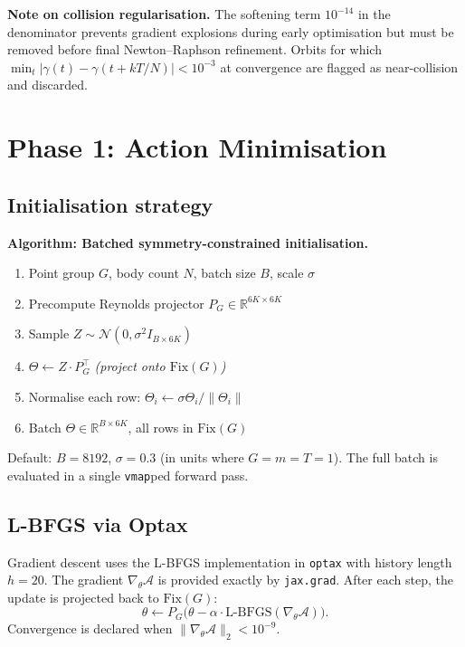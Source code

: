 \documentclass[12pt, a4paper]{article}
\theoremstyle{definition}
\newcommand{\R}{\mathbb{R}}
\newcommand{\Action}{\mathcal{A}}
\newcommand{\Fix}{\mathrm{Fix}}
\begin{document}
\textbf{Note on collision regularisation.} The softening term $10^{-14}$ in
the denominator prevents gradient explosions during early optimisation but
must be removed before final Newton--Raphson refinement.  Orbits for which
$\min_t |\gamma(t) - \gamma(t+kT/N)| < 10^{-3}$ at convergence are flagged
as near-collision and discarded.

\section{Phase 1: Action Minimisation}

\subsection{Initialisation strategy}

\textbf{Algorithm: Batched symmetry-constrained initialisation.}
\begin{enumerate}[leftmargin=1.8em]
  \item[(In)] Point group $G$, body count $N$, batch size $B$, scale $\sigma$
  \item[(1)] Precompute Reynolds projector $P_G \in \R^{6K \times 6K}$
  \item[(2)] Sample $Z \sim \mathcal{N}(0, \sigma^2 I_{B \times 6K})$
  \item[(3)] $\Theta \leftarrow Z \cdot P_G^\top$ \hfill \textit{(project onto $\Fix(G)$)}
  \item[(4)] Normalise each row: $\Theta_i \leftarrow \sigma \Theta_i / \|\Theta_i\|$
  \item[(Out)] Batch $\Theta \in \R^{B \times 6K}$, all rows in $\Fix(G)$
\end{enumerate}

Default: $B = 8192$, $\sigma = 0.3$ (in units where $G = m = T = 1$).
The full batch is evaluated in a single \texttt{vmap}ped forward pass.

\subsection{L-BFGS via Optax}

Gradient descent uses the L-BFGS implementation in \texttt{optax} with
history length $h = 20$.  The gradient $\nabla_\theta \Action$ is provided
exactly by \texttt{jax.grad}.  After each step, the update is projected back
to $\Fix(G)$:
\[
  \theta \leftarrow P_G \bigl(\theta - \alpha \cdot \text{L-BFGS}(\nabla_\theta
  \Action)\bigr).
\]
Convergence is declared when $\|\nabla_\theta \Action\|_2 < 10^{-9}$.
\end{document}
